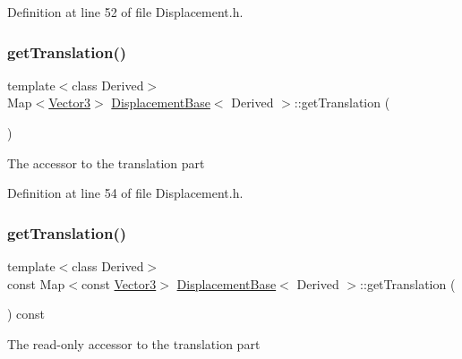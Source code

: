 Definition at line 52 of file Displacement.\+h.

\hypertarget{class_displacement_base_a034ba0c1d519c12ceeac9e72d417efb6}{}\label{class_displacement_base_a034ba0c1d519c12ceeac9e72d417efb6} 
\subsubsection{\texorpdfstring{get\+Translation()}{getTranslation()}\hspace{0.1cm}{\footnotesize\ttfamily [1/2]}}
{\footnotesize\ttfamily template$<$class Derived$>$ \\
Map$<$\hyperlink{class_displacement_base_a0b5e3b97de6478fd98bf6aec9730d4c4}{Vector3}$>$ \hyperlink{class_displacement_base}{Displacement\+Base}$<$ Derived $>$\+::get\+Translation (\begin{DoxyParamCaption}{ }\end{DoxyParamCaption})\hspace{0.3cm}{\ttfamily [inline]}}

The accessor to the translation part 

Definition at line 54 of file Displacement.\+h.

\hypertarget{class_displacement_base_a1d62cf28e94f43eef14d111c54112913}{}\label{class_displacement_base_a1d62cf28e94f43eef14d111c54112913} 
\subsubsection{\texorpdfstring{get\+Translation()}{getTranslation()}\hspace{0.1cm}{\footnotesize\ttfamily [2/2]}}
{\footnotesize\ttfamily template$<$class Derived$>$ \\
const Map$<$const \hyperlink{class_displacement_base_a0b5e3b97de6478fd98bf6aec9730d4c4}{Vector3}$>$ \hyperlink{class_displacement_base}{Displacement\+Base}$<$ Derived $>$\+::get\+Translation (\begin{DoxyParamCaption}{ }\end{DoxyParamCaption}) const\hspace{0.3cm}{\ttfamily [inline]}}

The read-\/only accessor to the translation part 

